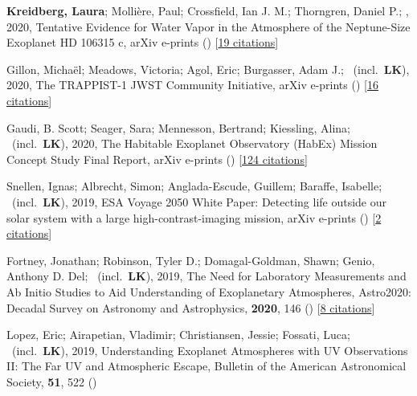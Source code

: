 \item[{\color{numcolor}\scriptsize11}] \textbf{Kreidberg, Laura}; Molli{\`e}re, Paul; Crossfield, Ian J. M.; Thorngren, Daniel P.; \etal, 2020, Tentative Evidence for Water Vapor in the Atmosphere of the Neptune-Size Exoplanet HD 106315 c, arXiv e-prints () [\href{https://ui.adsabs.harvard.edu/abs/2020arXiv200607444K}{19 citations}]

\item[{\color{numcolor}\scriptsize10}] Gillon, Micha{\"e}l; Meadows, Victoria; Agol, Eric; Burgasser, Adam J.; \etal\ (incl.\ \textbf{LK}), 2020, The TRAPPIST-1 JWST Community Initiative, arXiv e-prints () [\href{https://ui.adsabs.harvard.edu/abs/2020arXiv200204798G}{16 citations}]

\item[{\color{numcolor}\scriptsize9}] Gaudi, B. Scott; Seager, Sara; Mennesson, Bertrand; Kiessling, Alina; \etal\ (incl.\ \textbf{LK}), 2020, The Habitable Exoplanet Observatory (HabEx) Mission Concept Study Final Report, arXiv e-prints () [\href{https://ui.adsabs.harvard.edu/abs/2020arXiv200106683G}{124 citations}]

\item[{\color{numcolor}\scriptsize8}] Snellen, Ignas; Albrecht, Simon; Anglada-Escude, Guillem; Baraffe, Isabelle; \etal\ (incl.\ \textbf{LK}), 2019, ESA Voyage 2050 White Paper: Detecting life outside our solar system with a large high-contrast-imaging mission, arXiv e-prints () [\href{https://ui.adsabs.harvard.edu/abs/2019arXiv190801803S}{2 citations}]

\item[{\color{numcolor}\scriptsize7}] Fortney, Jonathan; Robinson, Tyler D.; Domagal-Goldman, Shawn; Genio, Anthony D. Del; \etal\ (incl.\ \textbf{LK}), 2019, The Need for Laboratory Measurements and Ab Initio Studies to Aid Understanding of Exoplanetary Atmospheres, Astro2020: Decadal Survey on Astronomy and Astrophysics, \textbf{2020}, 146 () [\href{https://ui.adsabs.harvard.edu/abs/2019astro2020T.146F}{8 citations}]

\item[{\color{numcolor}\scriptsize6}] Lopez, Eric; Airapetian, Vladimir; Christiansen, Jessie; Fossati, Luca; \etal\ (incl.\ \textbf{LK}), 2019, Understanding Exoplanet Atmospheres with UV Observations II: The Far UV and Atmospheric Escape, Bulletin of the American Astronomical Society, \textbf{51}, 522 ()

